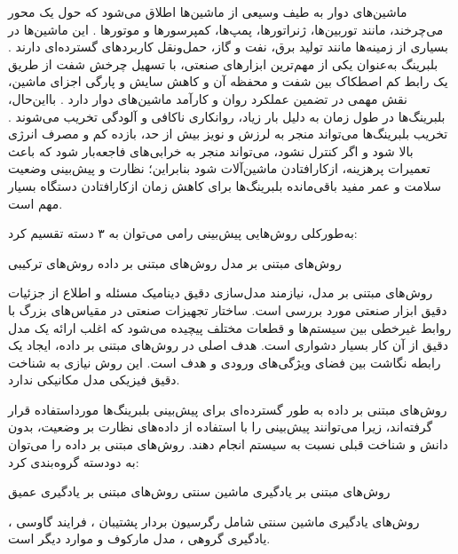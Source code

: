 
\label{litreture}



ماشین‌های دوار به طیف وسیعی از ماشین‌ها اطلاق می‌شود که حول یک محور می‌چرخند، مانند توربین‌ها، ژنراتورها، پمپ‌ها، کمپرسورها و موتورها . این ماشین‌ها در بسیاری از زمینه‌ها مانند تولید برق، نفت و گاز، حمل‌ونقل کاربردهای گسترده‌ای دارند . بلبرینگ به‌عنوان یکی از مهم‌ترین ابزارهای صنعتی، با تسهیل چرخش شفت از طریق یک رابط کم اصطکاک بین شفت و محفظه آن و کاهش سایش و پارگی اجزای ماشین، نقش مهمی در تضمین عملکرد روان و کارآمد ماشین‌های دوار دارد . بااین‌حال، بلبرینگ‌ها در طول زمان به دلیل بار زیاد، روانکاری ناکافی و آلودگی تخریب می‌شوند . تخریب بلبرینگ‌ها می‌تواند منجر به لرزش و نویز بیش از حد، بازده کم و مصرف انرژی بالا شود و اگر کنترل نشود، می‌تواند منجر به خرابی‌های فاجعه‌بار شود که باعث تعمیرات پرهزینه، ازکارافتادن ماشین‌آلات شود  بنابراین؛ نظارت و پیش‌بینی وضعیت سلامت و عمر مفید باقی‌مانده بلبرینگ‌ها برای کاهش زمان ازکارافتادن دستگاه بسیار مهم است.


 به‌طورکلی روش‌هایی پیش‌بینی  رامی می‌توان به ۳ دسته تقسیم کرد:
 
  روش‌های مبتنی بر مدل
  روش‌های مبتنی بر داده
  روش‌های ترکیبی
 



روش‌های مبتنی بر مدل، نیازمند مدل‌سازی دقیق دینامیک مسئله و اطلاع از جزئیات دقیق ابزار صنعتی مورد بررسی است. ساختار تجهیزات صنعتی در مقیاس‌های بزرگ با روابط غیرخطی بین سیستم‌ها و قطعات مختلف پیچیده می‌شود که اغلب ارائه یک مدل دقیق از آن کار بسیار دشواری است. هدف اصلی در روش‌های مبتنی بر داده، ایجاد یک رابطه نگاشت بین فضای ویژگی‌های ورودی و   هدف است. این روش نیازی به شناخت دقیق فیزیکی مدل مکانیکی ندارد.  


روش‌های مبتنی بر داده به طور گسترده‌ای برای پیش‌بینی  بلبرینگ‌ها مورداستفاده قرار گرفته‌اند، زیرا می‌توانند پیش‌بینی را با استفاده از داده‌های نظارت بر وضعیت، بدون دانش و شناخت قبلی نسبت به سیستم انجام دهند. روش‌های مبتنی بر داده را می‌توان به دودسته گروه‌بندی کرد: 


 روش‌های مبتنی بر یادگیری ماشین سنتی
 روش‌های مبتنی بر یادگیری عمیق



روش‌های یادگیری ماشین سنتی شامل رگرسیون بردار پشتیبان ، فرایند گاوسی ، یادگیری گروهی ، مدل مارکوف  و موارد دیگر است.



